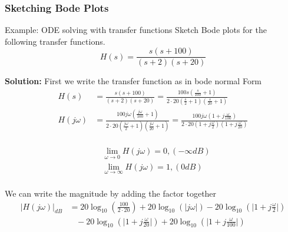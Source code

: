 \subsubsection{Sketching Bode Plots}
\begin{exampleblock}{Example: ODE solving with transfer functions}
Sketch Bode plots for the following transfer functions.
\begin{equation*}
    H(s) = \frac{s(s+100)}{(s+2)(s+20)}
\end{equation*}

\textbf{Solution:}
First we write the transfer function as in bode normal Form
\begin{align*}
    H(s) &= \frac{s(s+100)}{(s+2)(s+20)} 
     = \frac{100 s(\frac{s}{100}+1)}{2\cdot20(\frac{s}{2}+1)(\frac{s}{20}+1)} \\
    H(j\omega) &= \frac{100 j\omega(\frac{j\omega}{100}+1)}{2\cdot 20(\frac{j\omega}{2}+1)(\frac{j\omega}{20}+1)}
     = \frac{100 j\omega(1+j\frac{\omega}{100})}{2\cdot 20(1+j\frac{\omega}{2})(1+j\frac{\omega}{20})} \\
\end{align*}

\vspace{-1cm}
\begin{align*}
    &\lim_{\omega\to 0} H(j\omega) = 0, (-\infty dB) \\
    &\lim_{\omega\to \infty} H(j\omega) = 1, (0 dB) \\
\end{align*}

\vspace{-0.3cm}
We can write the magnitude by adding the factor together
\begin{align*}
    |H(j\omega)|_{dB} &= 20\log_{10}(\frac{100}{2\cdot 20})
    +20\log_{10}(|j\omega|) 
    -20\log_{10}(\big| 1+j\frac{\omega}{2}\big|) \\
    &\;\;\; -20\log_{10}(\big| 1+j\frac{\omega}{20}\big|)
    +20\log_{10}(\big| 1+j\frac{\omega}{100}\big|) \\
\end{align*}


\end{exampleblock}
